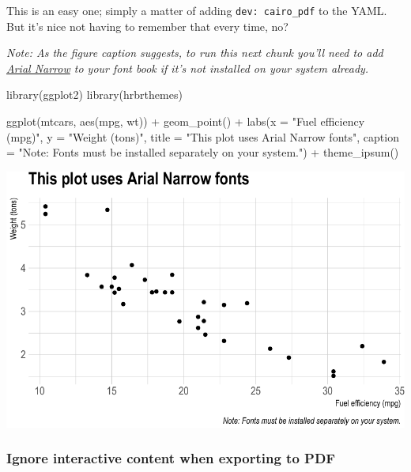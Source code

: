 \documentclass[
]{article}
\newenvironment{Shaded}{\begin{snugshade}}{\end{snugshade}}
\newcommand{\AttributeTok}[1]{\textcolor[rgb]{0.77,0.63,0.00}{#1}}
\newcommand{\FunctionTok}[1]{\textcolor[rgb]{0.00,0.00,0.00}{#1}}
\newcommand{\NormalTok}[1]{#1}
\newcommand{\SpecialCharTok}[1]{\textcolor[rgb]{0.00,0.00,0.00}{#1}}
\newcommand{\StringTok}[1]{\textcolor[rgb]{0.31,0.60,0.02}{#1}}
\begin{document}
This is an easy one; simply a matter of adding \texttt{dev:\ cairo\_pdf}
to the YAML. But it's nice not having to remember that every time, no?

\emph{Note: As the figure caption suggests, to run this next chunk
you'll need to add
\href{https://docs.microsoft.com/en-us/typography/font-list/arial-narrow}{Arial
Narrow} to your font book if it's not installed on your system already.}

\begin{Shaded}
\begin{Highlighting}[]
\FunctionTok{library}\NormalTok{(ggplot2)}
\FunctionTok{library}\NormalTok{(hrbrthemes)}

\FunctionTok{ggplot}\NormalTok{(mtcars, }\FunctionTok{aes}\NormalTok{(mpg, wt)) }\SpecialCharTok{+}
  \FunctionTok{geom\_point}\NormalTok{() }\SpecialCharTok{+}
  \FunctionTok{labs}\NormalTok{(}\AttributeTok{x =} \StringTok{"Fuel efficiency (mpg)"}\NormalTok{, }\AttributeTok{y =} \StringTok{"Weight (tons)"}\NormalTok{,}
       \AttributeTok{title =} \StringTok{"This plot uses Arial Narrow fonts"}\NormalTok{,}
       \AttributeTok{caption =} \StringTok{"Note: Fonts must be installed separately on your system."}\NormalTok{) }\SpecialCharTok{+} 
  \FunctionTok{theme\_ipsum}\NormalTok{()}
\end{Highlighting}
\end{Shaded}

\includegraphics{Chapter1_files/figure-latex/mpg-1.pdf}

\hypertarget{ignore-interactive-content-when-exporting-to-pdf}{%
\subsubsection{Ignore interactive content when exporting to
PDF}\label{ignore-interactive-content-when-exporting-to-pdf}}
\end{document}
